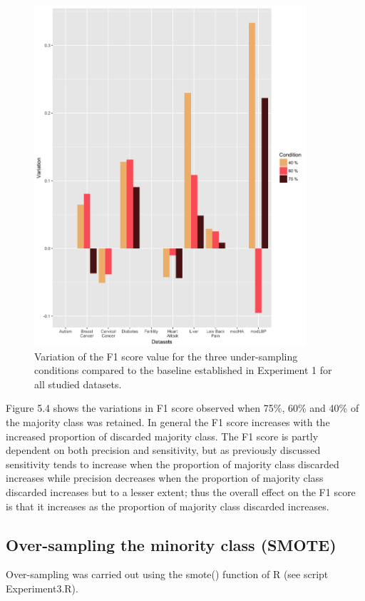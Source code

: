 \begin{figure}[!htbp]
    \centering
    \includegraphics[width=0.9\textwidth]{ThesisTemplate/usingLatex/chapter5Images/F1VariationUnderBySets.png}
    \caption{Variation of the F1 score value for the three under-sampling conditions compared to the baseline established in Experiment 1 for all studied datasets.}
    \label{fig:my_label}
\end{figure}

Figure 5.4 shows the variations in F1 score observed when 75\%, 60\% and 40\% of the majority class was retained. In general the F1 score increases with the increased proportion of discarded majority class. The F1 score is partly dependent on both precision and sensitivity, but as previously discussed sensitivity tends to increase when the proportion of majority class discarded increases while precision decreases when the proportion of majority class discarded increases but to a lesser extent; thus the overall effect on the F1 score is that it increases as the proportion of majority class discarded increases.\newline

\subsection{Over-sampling the minority class (SMOTE)}
Over-sampling was carried out using the smote() function of R (see script Experiment3.R).

